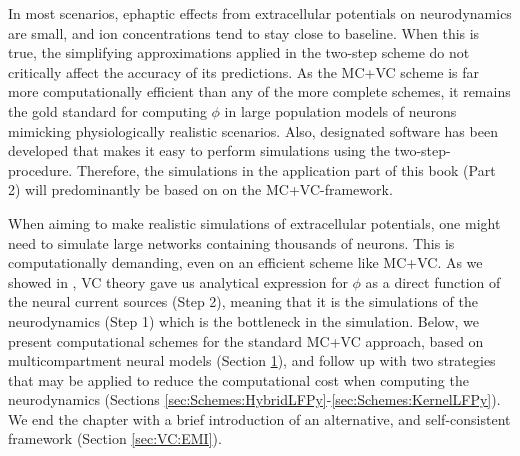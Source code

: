 In most scenarios, ephaptic effects from extracellular potentials on neurodynamics are small, and ion concentrations tend to stay close to baseline. When this is true, the simplifying approximations applied in the two-step scheme do not critically affect the accuracy of its predictions. As the MC+VC scheme is far more computationally efficient than any of the more complete schemes, it remains the gold standard for computing $\phi$ in large population models of neurons mimicking physiologically realistic scenarios. Also, designated software has been developed that makes it easy to perform simulations using the two-step-procedure. Therefore, the simulations in the application part of this book (Part 2) will predominantly be based on on the MC+VC-framework.

When aiming to make realistic simulations of extracellular potentials, one might need to simulate large networks containing thousands of neurons. This is computationally demanding, even on an efficient scheme like MC+VC.
As we showed in ,
VC theory gave us  analytical expression for $\phi$ as a direct function of the neural current sources (Step 2), meaning that it is  the simulations of the neurodynamics (Step 1) which is the bottleneck in the simulation. Below, we present computational schemes for the standard MC+VC approach, based on multicompartment neural models (Section \ref{sec:Schemes:LFPy}), and follow up with two strategies that may be applied to reduce the computational cost when computing the neurodynamics (Sections \ref{sec:Schemes:HybridLFPy}-\ref{sec:Schemes:KernelLFPy}). We end the chapter with a brief introduction of an alternative, and self-consistent framework (Section \ref{sec:VC:EMI}).





\section{\ehnote{}}
\label{sec:Schemes:LFPy}


